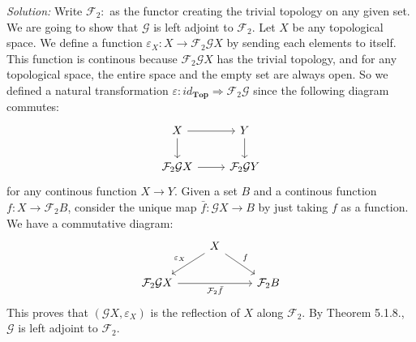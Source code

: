 \documentclass[a4paper, 12pt]{article}
\newenvironment{solution}
    {\textit{Solution:}}
    {}
\begin{document}
\begin{solution}
Write \(\mathcal{F}_2:\) as the functor creating the trivial topology on any given set. We are going to show that \(\mathcal{G}\) is left adjoint to \(\mathcal{F}_2\). Let \(X\) be any topological space. We define a function \(\varepsilon_X:X\rightarrow \mathcal{F}_2 \mathcal{G}X\) by 
sending each elements to itself. This function is continous because \(\mathcal{F}_2 \mathcal{G}X\) has the trivial topology, and for any topological space, the entire space and the empty set are always open. So we defined a natural transformation 
\(\varepsilon:id_{\mathbf{Top}}\Rightarrow \mathcal{F}_2 \mathcal{G}\) since the following diagram commutes:
\[\begin{tikzcd}
	X & Y \\
	{\mathcal{F}_2\mathcal{G}X} & {\mathcal{F}_2\mathcal{G}Y}
	\arrow[from=1-1, to=1-2]
	\arrow[from=1-1, to=2-1]
	\arrow[from=1-2, to=2-2]
	\arrow[from=2-1, to=2-2]
\end{tikzcd}\]
for any continous function \(X\rightarrow Y\). Given a set \(B\) and a continous function \(f:X\rightarrow \mathcal{F}_2 B\), consider the unique map \(\bar{f}:\mathcal{G}X\rightarrow B\) by just taking \(f\) as a function. We have a commutative diagram: 
\[\begin{tikzcd}
	& X \\
	{\mathcal{F}_2\mathcal{G}X} && {\mathcal{F}_2B}
	\arrow["{\varepsilon_X}"', from=1-2, to=2-1]
	\arrow["f", from=1-2, to=2-3]
	\arrow["{\mathcal{F}_2\bar{f}}"', from=2-1, to=2-3]
\end{tikzcd}\]
This proves that \((\mathcal{G}X,\varepsilon_X)\) is the reflection of \(X\) along \(\mathcal{F}_2\). By Theorem 5.1.8., \(\mathcal{G}\) is left adjoint to \(\mathcal{F}_2\).
\end{solution}
\end{document}
